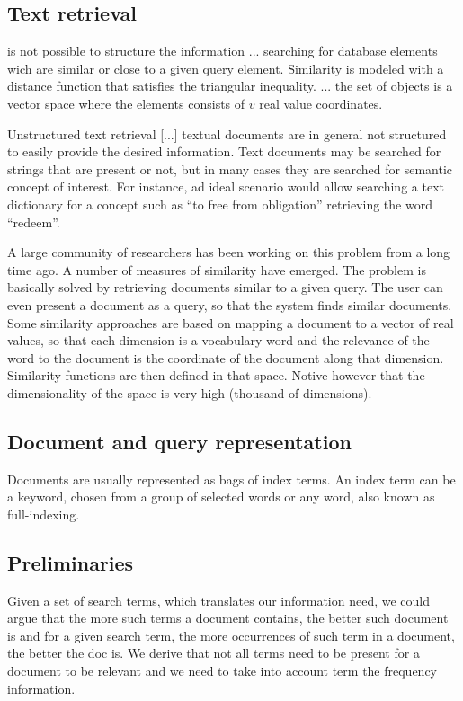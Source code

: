 \subsection{Text retrieval}
is not possible to structure the information ... searching for database elements wich are similar or close to a given query element. Similarity is modeled with a distance function that satisfies the triangular inequality. ... the set of objects is a vector space where the elements consists of $v$ real value coordinates.

Unstructured  text retrieval [...] textual documents are in general not structured to easily provide the desired information. Text documents may be searched for strings that are present or not, but in many cases they are searched for semantic concept of interest. For instance, ad ideal scenario would allow searching a text dictionary for a concept such as ``to free from obligation'' retrieving the word ``redeem''.

A large community of researchers has been working on this problem from a long time ago. A number of measures of similarity have emerged. The problem is basically solved by retrieving documents similar to a given query. The user can even present a document as a query, so that the system finds similar documents. Some similarity approaches are based on mapping a document to a vector of real values, so that each dimension is a vocabulary word and the relevance of the word to the document is the coordinate of the document along that dimension. Similarity functions are then defined in that space. Notive however that the dimensionality of the space is very high (thousand of dimensions).

\subsection{Document and query representation}
Documents are usually represented as bags of index terms. An index term can be a keyword, chosen from a group of selected words or any word, also known as full-indexing.

\subsection{Preliminaries}
Given a set of search terms, which translates our information need, we could argue that the more such terms a document contains, the better such document is and for a given search term, the more occurrences of such term in a document, the better the doc is. We derive that not all terms need to be present for a document to be relevant and we need to take into account term the frequency information.


